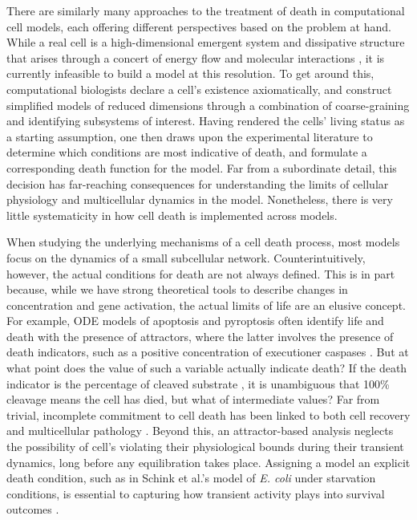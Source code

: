 \documentclass{article}
\begin{document}
There are similarly many approaches to the treatment of death in computational cell models, each offering different perspectives based on the problem at hand. While a real cell is a high-dimensional emergent system and dissipative structure that arises through a concert of energy flow and molecular interactions \cite{sole_fundamental_2024}, it is currently infeasible to build a model at this resolution. To get around this, computational biologists declare a cell’s existence axiomatically, and construct simplified models of reduced dimensions through a combination of coarse-graining and identifying subsystems of interest. Having rendered the cells' living status as a starting assumption, one then draws upon the experimental literature to determine which conditions are most indicative of death, and formulate a corresponding death function for the model. Far from a subordinate detail, this decision has far-reaching consequences for understanding the limits of cellular physiology and multicellular dynamics in the model. Nonetheless, there is very little systematicity in how cell death is implemented across models.

When studying the underlying mechanisms of a cell death process, most models focus on the dynamics of a small subcellular network. Counterintuitively, however, the actual conditions for death are not always defined. This is in part because, while we have strong theoretical tools to describe changes in concentration and gene activation, the actual limits of life are an elusive concept. For example, ODE models of apoptosis and pyroptosis often identify life and death with the presence of attractors, where the latter involves the presence of death indicators, such as a positive concentration of executioner caspases \cite{eissing_bistability_2004, spencer_measuring_2011, yin_cell_2021, li_caspase-1_2022}. But at what point does the value of such a variable actually indicate death? If the death indicator is the percentage of cleaved substrate \cite{rehm_systems_2006}, it is unambiguous that 100\% cleavage means the cell has died, but what of intermediate values? Far from trivial, incomplete commitment to cell death has been linked to both cell recovery and multicellular pathology \cite{bock_mitochondria_2020}. Beyond this, an attractor-based analysis neglects the possibility of cell’s violating their physiological bounds during their transient dynamics, long before any equilibration takes place. Assigning a model an explicit death condition, such as in Schink et al.’s model of \textit{E. coli} under starvation conditions, is essential to capturing how transient activity plays into survival outcomes \cite{schink_survival_2024, xu_electric_2024}.
\end{document}
